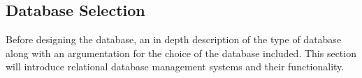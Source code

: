 \subsection{Database Selection}

Before designing the database, an in depth description of the type of database along with an argumentation for the choice of the database included. This section will introduce relational database management systems and their functionality.